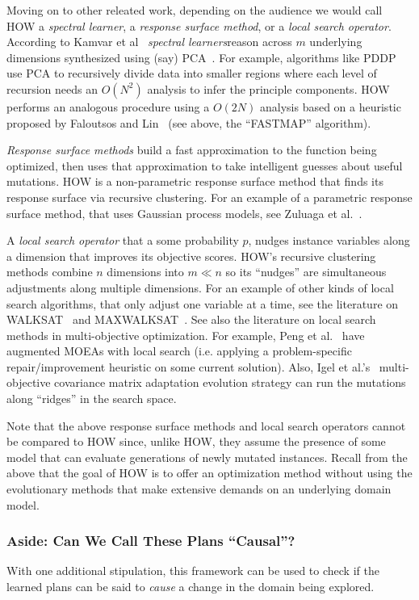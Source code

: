 Moving on to other releated work, depending on the audience  we would
 call HOW a {\em spectral learner}, 
a {\em response surface method}, or  a {\em local search operator}.
According to
Kamvar et al~\cite{kamvar03}
{\em spectral learners}reason across $m$ underlying dimensions synthesized
using (say) PCA~\cite{pearson1901}. For example,
algorithms like PDDP~\cite{boley98} use PCA to
recursively divide data into smaller regions where each level of recursion needs an   $O(N^2)$ analysis
to infer the principle components. HOW performs an analogous procedure using a   $O(2N)$ analysis
based on a heuristic proposed by
Faloutsos and Lin~\cite{Faloutsos1995} (see above, the ``FASTMAP'' algorithm).

{\em Response surface methods}  build a fast approximation to the function being optimized,
then uses that  approximation to take intelligent guesses about useful mutations. HOW
is a non-parametric response surface method that finds its response surface via recursive
clustering. For an example of a parametric response surface method, that uses Gaussian process
models, see Zuluaga et al.~\cite{zuluaga13}.

A {\em local search operator} that a some probability $p$, nudges  instance variables
along a dimension that improves its objective scores. HOW's recursive clustering methods
combine $n$ dimensions into $m \ll n$ so its ``nudges'' are simultaneous
adjustments along multiple dimensions. For an example of other kinds of local search algorithms, that only adjust
one variable at a time, see the literature on WALKSAT~\cite{Selman1992} and MAXWALKSAT~\cite{kautz97}.
See also the literature on local search methods in multi-objective optimization.
For example,
Peng et al.~\cite{peng09:ls} have augmented MOEAs with
local search  (i.e. applying a problem-specific repair/improvement
heuristic on some current solution).
Also, Igel et al.'s~\cite{igel07} multi-objective
covariance matrix adaptation evolution strategy
can run the mutations along  ``ridges'' in the search space.

Note that the above response surface methods and local search operators cannot be compared to HOW
since, unlike HOW, they assume the presence of some model that can evaluate generations of newly mutated
instances. Recall from the above that the goal of HOW is to offer an optimization method without
using the evolutionary methods that make extensive demands on an underlying domain model.



 
 \subsubsection{Aside: Can We Call These Plans ``Causal''?}
With one additional stipulation,   this framework can be used to check if the learned
plans can be said to {\em cause} a change in the domain being explored.

